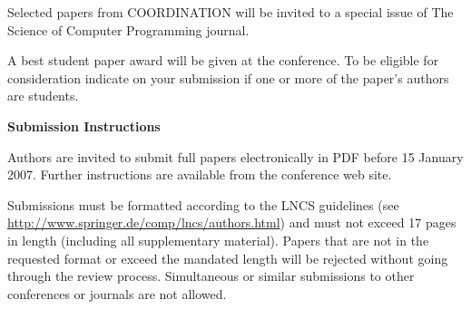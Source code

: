 \documentclass[11pt]{article}
\begin{document}
Selected papers from COORDINATION will be invited to a special issue
of The Science of Computer Programming journal.

A best student paper award will be given at the conference. To be
eligible for consideration indicate on your submission if one or more
of the paper's authors are students.

\begin{center}
{\bf Submission Instructions}
\end{center}

Authors are invited to submit full papers electronically in PDF before
15 January 2007. Further instructions are available from the
conference web site.

Submissions must be formatted according to the LNCS guidelines (see
\url{http://www.springer.de/comp/lncs/authors.html}) and must not
exceed 17 pages in length (including all supplementary
material). Papers that are not in the requested format or exceed the
mandated length will be rejected without going through the review
process. Simultaneous or similar submissions to other conferences or
journals are not allowed.
\end{document}

